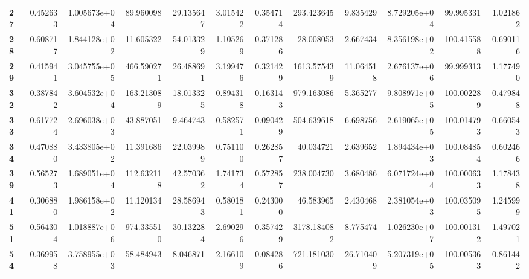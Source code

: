 \begin{table}[h]
\begin{tabular}{lrrrrrrrrrrr}
\textbf{27} &  0.452633 &   1.005673e+04 &       89.960098 &                  29.135647 &  3.015422 &  0.354714 &   293.423645 &   9.835429 &  8.729205e+04 &   99.995331 &     1.021862 \\
\textbf{28} &  0.608717 &   1.844128e+02 &       11.605322 &                  54.013329 &  1.105269 &  0.371286 &    28.008053 &   2.667434 &  8.356198e+02 &  100.415588 &     0.690116 \\
\textbf{29} &  0.415941 &   3.045755e+05 &      466.590271 &                  26.488691 &  3.199476 &  0.321429 &  1613.575439 &  11.064518 &  2.676137e+06 &   99.999313 &     1.177490 \\
\textbf{32} &  0.387842 &   3.604532e+04 &      163.213089 &                  18.013325 &  0.894318 &  0.163143 &   979.163086 &   5.365277 &  9.808971e+05 &  100.002289 &     0.479848 \\
\textbf{33} &  0.617724 &   2.696038e+03 &       43.887051 &                   9.464743 &  0.582571 &  0.090429 &   504.639618 &   6.698756 &  2.619065e+05 &  100.014793 &     0.660543 \\
\textbf{34} &  0.470880 &   3.433805e+02 &       11.391686 &                  22.039989 &  0.751100 &  0.262857 &    40.034721 &   2.639652 &  1.894434e+03 &  100.084854 &     0.602466 \\
\textbf{39} &  0.565273 &   1.689051e+04 &      112.632118 &                  42.570362 &  1.741734 &  0.572857 &   238.004730 &   3.680486 &  6.071724e+04 &  100.000633 &     1.178438 \\
\textbf{41} &  0.306880 &   1.986158e+02 &       11.120134 &                  28.586943 &  0.580181 &  0.243000 &    46.583965 &   2.430468 &  2.381054e+03 &  100.035095 &     1.245999 \\
\textbf{51} &  0.564304 &   1.018887e+06 &      974.335510 &                  30.132284 &  2.690296 &  0.357429 &  3178.184082 &   8.775474 &  1.026230e+07 &  100.001312 &     1.497021 \\
\textbf{54} &  0.369958 &   3.758955e+03 &       58.484943 &                   8.046871 &  2.166109 &  0.084286 &   721.181030 &  26.710409 &  5.207319e+05 &  100.005363 &     0.861442 \\
\bottomrule
\end{tabular}
\end{table}
